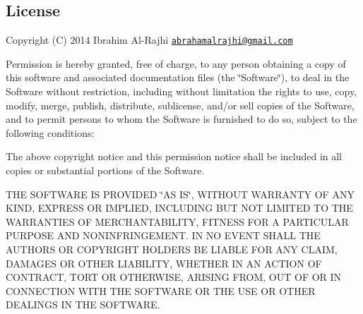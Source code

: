 \subsection*{License}

Copyright (C) 2014 Ibrahim Al-\/\+Rajhi \href{mailto:abrahamalrajhi@gmail.com}{\tt abrahamalrajhi@gmail.\+com}

Permission is hereby granted, free of charge, to any person obtaining a copy of this software and associated documentation files (the \char`\"{}\+Software\char`\"{}), to deal in the Software without restriction, including without limitation the rights to use, copy, modify, merge, publish, distribute, sublicense, and/or sell copies of the Software, and to permit persons to whom the Software is furnished to do so, subject to the following conditions\+:

The above copyright notice and this permission notice shall be included in all copies or substantial portions of the Software.

T\+HE S\+O\+F\+T\+W\+A\+RE IS P\+R\+O\+V\+I\+D\+ED \char`\"{}\+A\+S I\+S\char`\"{}, W\+I\+T\+H\+O\+UT W\+A\+R\+R\+A\+N\+TY OF A\+NY K\+I\+ND, E\+X\+P\+R\+E\+SS OR I\+M\+P\+L\+I\+ED, I\+N\+C\+L\+U\+D\+I\+NG B\+UT N\+OT L\+I\+M\+I\+T\+ED TO T\+HE W\+A\+R\+R\+A\+N\+T\+I\+ES OF M\+E\+R\+C\+H\+A\+N\+T\+A\+B\+I\+L\+I\+TY, F\+I\+T\+N\+E\+SS F\+OR A P\+A\+R\+T\+I\+C\+U\+L\+AR P\+U\+R\+P\+O\+SE A\+ND N\+O\+N\+I\+N\+F\+R\+I\+N\+G\+E\+M\+E\+NT. IN NO E\+V\+E\+NT S\+H\+A\+LL T\+HE A\+U\+T\+H\+O\+RS OR C\+O\+P\+Y\+R\+I\+G\+HT H\+O\+L\+D\+E\+RS BE L\+I\+A\+B\+LE F\+OR A\+NY C\+L\+A\+IM, D\+A\+M\+A\+G\+ES OR O\+T\+H\+ER L\+I\+A\+B\+I\+L\+I\+TY, W\+H\+E\+T\+H\+ER IN AN A\+C\+T\+I\+ON OF C\+O\+N\+T\+R\+A\+CT, T\+O\+RT OR O\+T\+H\+E\+R\+W\+I\+SE, A\+R\+I\+S\+I\+NG F\+R\+OM, O\+UT OF OR IN C\+O\+N\+N\+E\+C\+T\+I\+ON W\+I\+TH T\+HE S\+O\+F\+T\+W\+A\+RE OR T\+HE U\+SE OR O\+T\+H\+ER D\+E\+A\+L\+I\+N\+GS IN T\+HE S\+O\+F\+T\+W\+A\+RE. 
